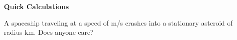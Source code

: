 \documentclass[11pt]{exam}
\begin{document}
\begin{questions}
\addpoints
\question[16] \textbf{Quick Calculations}
\noaddpoints
{}
\newpage
\begin{figure}\begin{center}
    \end{center}\end{figure}
\addpoints
\question[12] A spaceship traveling at a speed of \Pc m/s crashes into a stationary asteroid of radius \Pd km. Does anyone care?


  \vfill
  \newpage
  


\end{questions}
\end{document}
